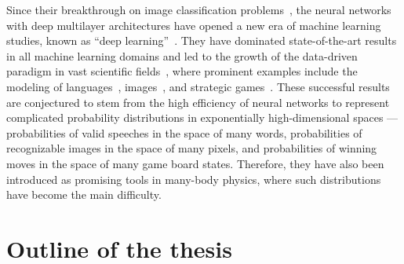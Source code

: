 Since their breakthrough on image classification problems~\cite{krizhevsky2012imagenet}, the neural networks with deep multilayer architectures have opened a new era of machine learning studies, known as ``deep learning''~\cite{goodfellow2016deep}. They have dominated state-of-the-art results in all machine learning domains and led to the growth of the data-driven paradigm in vast scientific fields~\cite{montans2019data}, where prominent examples include the modeling of languages~\cite{brown2020language}, images~\cite{rombach2022high}, and strategic games~\cite{silver2016mastering}. These successful results are conjectured to stem from the high efficiency of neural networks to represent complicated probability distributions in exponentially high-dimensional spaces --- probabilities of valid speeches in the space of many words, probabilities of recognizable images in the space of many pixels, and probabilities of winning moves in the space of many game board states. Therefore, they have also been introduced as promising tools in many-body physics, where such distributions have become the main difficulty.

\section{Outline of the thesis}

